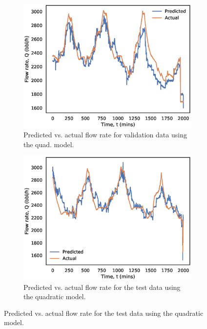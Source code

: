 \newpage
\begin{figure}[h]
     \centering
     \begin{subfigure}[b]{0.45\textwidth}
         \centering
         \includegraphics[width=\textwidth]{images/08quad_validation.eps}
         \caption{Predicted vs. actual flow rate for validation data using the quad. model.}
         \label{fig:08quad_validation}
     \end{subfigure}
     \begin{subfigure}[b]{0.45\textwidth}
         \centering
         \includegraphics[width=\textwidth]{images/08quad_test.eps}
         \caption{Predicted vs. actual flow rate for the test data using the quadratic model.}
         \label{fig:08quad_test}
     \end{subfigure}

\end{figure}
